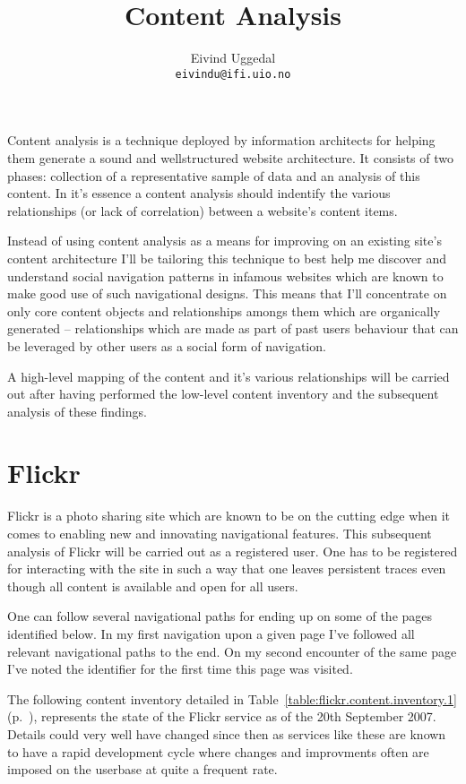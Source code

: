 \documentclass[11pt,a4paper]{article}
\title{Content Analysis}
\author{Eivind Uggedal\\
        \texttt{eivindu@ifi.uio.no}}
\date{}
\begin{document}
\maketitle{}

Content analysis is a technique deployed by information architects for helping
them generate a sound and wellstructured website architecture. It consists of
two phases: collection of a representative sample of data and an analysis of
this content. In it's essence a content analysis should indentify the various
relationships (or lack of correlation) between a website's content items.

Instead of using content analysis as a means for improving on an existing
site's content architecture I'll be tailoring this technique to best help me
discover and understand social navigation patterns in infamous websites which
are known to make good use of such navigational designs. This means that I'll
concentrate on only core content objects and relationships amongs them
which are organically generated -- relationships which are made as part of
past users behaviour that can be leveraged by other users as a social form
of navigation.

A high-level mapping of the content and it's various relationships
will be carried out after having performed the low-level content inventory
and the subsequent analysis of these findings.

\section{Flickr}

Flickr is a photo sharing site which are known to be on the cutting edge when
it comes to enabling new and innovating navigational features. This subsequent
analysis of Flickr will be carried out as a registered user. One has to be
registered for interacting with the site in such a way that one leaves
persistent traces even though all content is available and open for all users.

One can follow several navigational paths for ending up on some of the pages
identified below. In my first navigation upon a given page I've followed all
relevant navigational paths to the end. On my second encounter of the same
page I've noted the identifier for the first time this page was visited.

The following content inventory detailed in
Table~\ref{table:flickr.content.inventory.1}
(p.~\pageref{table:flickr.content.inventory.1}),
represents the state of the Flickr service as of the 20th September 2007.
Details could very well have changed since then as
services like these are known to have a rapid development cycle
where changes and improvments often are imposed on the userbase at quite
a frequent rate.
\end{document}
